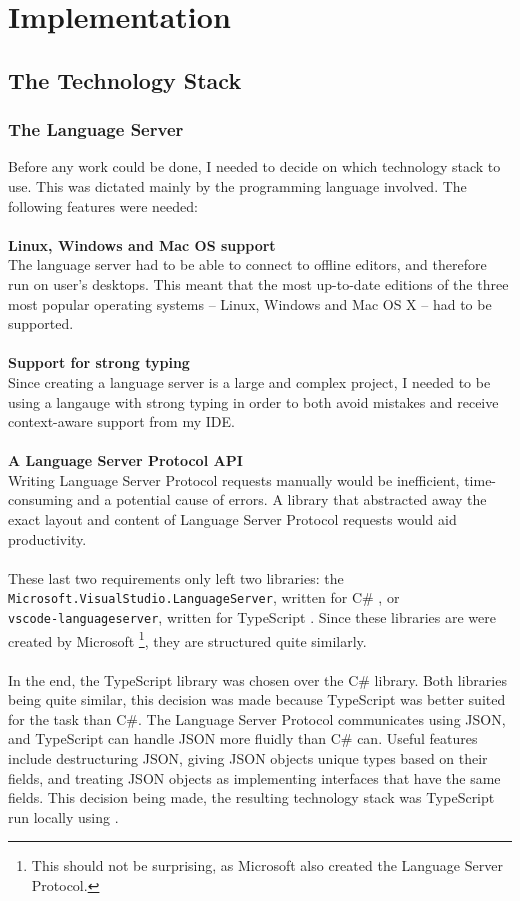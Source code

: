 \documentclass[../main.tex]{subfiles}
\begin{document}
\chapter{Implementation}
\section{The Technology Stack}
\subsection{The Language Server}
Before any work could be done, I needed to decide on which technology stack to use. This was dictated mainly by the programming language involved. The following features were needed:
\\
\\
\textbf{Linux, Windows and Mac OS support} \\
The language server had to be able to connect to offline editors, and therefore run on user's desktops. This meant that the most up-to-date editions of the three most popular operating systems -- Linux, Windows and Mac OS X -- had to be supported.
\\
\\
\textbf{Support for strong typing} \\
Since creating a language server is a large and complex project, I needed to be using a langauge with strong typing in order to both avoid mistakes and receive context-aware support from my IDE.
\\
\\
\textbf{A Language Server Protocol API} \\
Writing Language Server Protocol requests manually would be inefficient, time-consuming and a potential cause of errors. A library that abstracted away the exact layout and content of Language Server Protocol requests would aid productivity.
\\ 
\\
These last two requirements only left two libraries: the \\ 
\texttt{Microsoft.VisualStudio.LanguageServer}, written for C\# \cite{visual_studio_language_server}, or \\ 
\texttt{vscode-languageserver}, written for TypeScript \cite{vsc_langserver_docs}. Since these libraries are were created by Microsoft \footnote{This should not be surprising, as Microsoft also created the Language Server Protocol.}, they are structured quite similarly. 
\\
\\
In the end, the TypeScript library was chosen over the C\# library. Both libraries being quite similar, this decision was made because TypeScript was better suited for the task than C\#. The Language Server Protocol communicates using JSON, and TypeScript can handle JSON more fluidly than C\# can. Useful features include destructuring JSON, giving JSON objects unique types based on their fields, and treating JSON objects as implementing interfaces that have the same fields. This decision being made, the resulting technology stack was TypeScript run locally using . 
\end{document}
